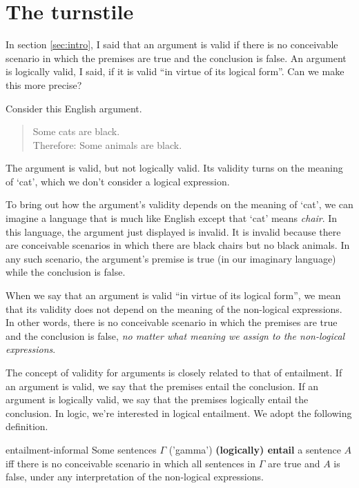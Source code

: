 \section{The turnstile}
\label{sec:turnstile}

In section \ref{sec:intro}, I said that an argument is valid if there is no
conceivable scenario in which the premises are true and the conclusion is false.
An argument is logically valid, I said, if it is valid ``in virtue of its
logical form''. Can we make this more precise?

Consider this English argument.
%
\begin{quote}
  Some cats are black.\\
  Therefore: Some animals are black.
\end{quote}
%
The argument is valid, but not logically valid. Its validity turns on the
meaning of `cat', which we don't consider a logical expression.

To bring out how the argument's validity depends on the meaning of `cat', we can
imagine a language that is much like English except that `cat' means
\emph{chair}. In this language, the argument just displayed is invalid. It is
invalid because there are conceivable scenarios in which there are black chairs
but no black animals. In any such scenario, the argument's premise is true (in
our imaginary language) while the conclusion is false.

When we say that an argument is valid ``in virtue of its logical form'', we mean
that its validity does not depend on the meaning of the non-logical expressions.
In other words, there is no conceivable scenario in which the premises are true
and the conclusion is false, \emph{no matter what meaning we assign to the
  non-logical expressions}.

The concept of validity for arguments is closely related to that of entailment.
If an argument is valid, we say that the premises entail the conclusion. If an
argument is logically valid, we say that the premises logically entail the
conclusion. In logic, we're interested in logical entailment. We adopt the
following definition.

\begin{definition}{}{entailment-informal}
  Some sentences $\Gamma$ ('gamma') \textbf{(logically) entail} a sentence $A$
  iff there is no conceivable scenario in which all sentences in $\Gamma$ are
  true and $A$ is false, under any interpretation of the non-logical
  expressions.
\end{definition}

